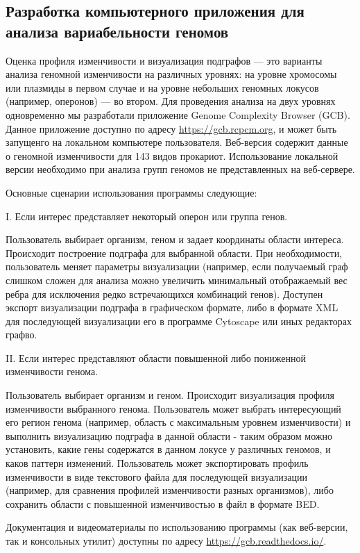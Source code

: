 \subsection*{Разработка компьютерного приложения для анализа вариабельности геномов} \label{chaptGCB}

Оценка профиля изменчивости и визуализация подграфов --- это варианты анализа геномной изменчивости на различных уровнях: на уровне хромосомы или плазмиды в первом случае и на уровне небольших геномных локусов (например, оперонов) --- во втором. Для проведения анализа на двух уровнях одновременно мы разработали приложение Genome Complexity Browser (GCB). Данное приложение доступно по адресу \url{https://gcb.rcpcm.org}, и может быть запущенго на локальном компьютере пользователя. Веб-версия содержит данные о геномной изменчивости для 143 видов прокариот. Использование локальной версии необходимо при анализа групп геномов не представленных на веб-сервере.

Основные сценарии использования программы следующие:

I. Если интерес представляет некоторый оперон или группа генов.

Пользователь выбирает организм, геном и задает координаты области интереса. Происходит построение подграфа для выбранной области. При необходимости, пользователь меняет параметры визуализации (например, если получаемый граф слишком сложен для анализа можно увеличить минимальный отображаемый вес ребра для исключения редко встречающихся комбинаций генов). Доступен экспорт визуализации подграфа в графическом формате, либо в формате XML для последующей визуализации его в программе Cytoscape или иных редакторах графво. 

II. Если интерес представляют области повышенной либо пониженной изменчивости генома.

Пользователь выбирает организм и геном. Происходит визуализация профиля изменчивости выбранного генома. Пользователь может выбрать интересующий его регион генома (например, область с максимальным уровнем изменчивости) и выполнить визуализацию подграфа в данной области - таким образом можно установить, какие гены содержатся в данном локусе у различных геномов, и каков паттерн изменений. Пользователь может экспортировать профиль изменчивости в виде текстового файла для последующей визуализации (например, для сравнения профилей изменчивости разных организмов), либо сохранить области с повышенной изменчивостью в файл в формате BED. 

Документация и видеоматериалы по использованию программы (как веб-версии, так и консольных утилит) доступны по адресу \url{https://gcb.readthedocs.io/}. 

